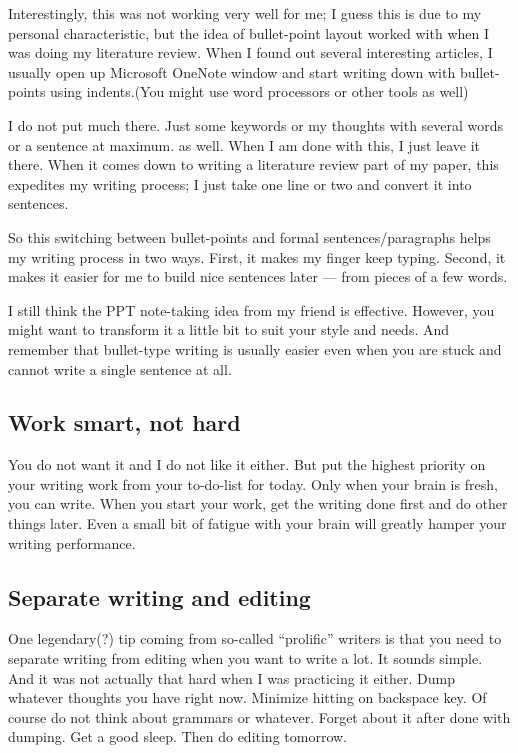 \documentclass[11pt]{article}
\begin{document}
Interestingly, this was not working very well for me; I guess this is due to
my personal characteristic, but the idea of bullet-point layout worked with
when I was doing my literature review. When I found out several interesting
articles, I usually open up Microsoft OneNote window and start writing down
with bullet-points using indents.(You might use word processors or other tools
as well)

I do not put much there. Just some keywords or my thoughts with several words
or a sentence at maximum.  as well. When I am done with this, I just leave it
there. When it comes down to writing a literature review part of my paper,
this expedites my writing process; I just take one line or two and convert it
into sentences. 

So this switching between bullet-points and formal sentences/paragraphs helps
my writing process in two ways. First, it makes my finger keep typing. Second,
it makes it easier for me to build nice sentences later --- from pieces of a
few words.

I still think the PPT note-taking idea from my friend is effective. However,
you might want to transform it a little bit to suit your style and needs. And
remember that bullet-type writing is usually easier even when you are stuck
and cannot write a single sentence at all.

\subsection{Work smart, not hard}

You do not want it and I do not like it either. But put the
highest priority on your writing work from your to-do-list for
today. Only when your brain is fresh, you can write. When you
start your work, get the writing done first and do other things
later. Even a small bit of fatigue with your brain will greatly
hamper your writing performance.

\subsection{Separate writing and editing}
One legendary(?) tip coming from so-called ``prolific'' writers is
that you need to separate writing from editing when you want to write
a lot. It sounds simple. And it was not actually that hard when I
was practicing it either. Dump whatever thoughts you have right now.
Minimize hitting on backspace key. Of course do not think about grammars
or whatever. Forget about it after done with dumping. Get a good sleep.
Then do editing tomorrow.
\end{document}

